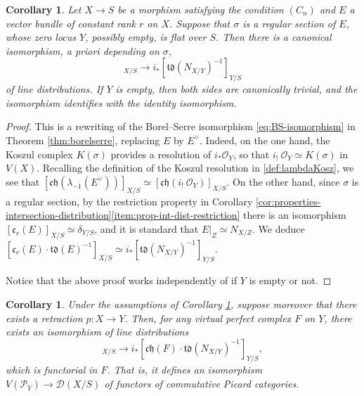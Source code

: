\documentclass[11pt]{article}
\theoremstyle{plain}
\newtheorem{corollary}[theorem]{Corollary}
\theoremstyle{definition}
\newcommand{\Dcal}{\mathcal D}
\newcommand{\Ocal}{\mathcal O}
\newcommand{\Pcal}{\mathcal P}
\newcommand{\cfrak}{\mathfrak c}
\newcommand{\chfrak}{\mathfrak {ch}}
\newcommand{\tdfrak}{\mathfrak {td}}
\begin{document}
\begin{corollary}\label{cor:Borel-Serre-consequence}
Let $X\to S$ be a morphism satisfying the condition $(C_n)$ and $E$ a vector bundle of constant rank $r$ on $X$. Suppose that $\sigma$ is a regular section of $E$, whose zero locus $Y$, possibly empty, is flat over $S$. Then there is a canonical isomorphism, a priori depending on $\sigma$,\vspace*{-3pt}
\begin{displaymath}
[\chfrak(i_! \ \Ocal_Y)]_{X/S} \to i_\ast [\tdfrak(N_{X/Y})^{-1}]_{Y/S}
\end{displaymath}
of line distributions. If $Y$ is empty, then both sides are canonically trivial, and the isomorphism identifies with the identity isomorphism.

\end{corollary}

\begin{proof}
This is a rewriting of the Borel--Serre isomorphism \eqref{eq:BS-isomorphism} in Theorem \ref{thm:borelserre}, replacing $E$ by $E^\vee$. Indeed, on the one hand, the Koszul complex $K(\sigma)$ provides a resolution of $i_{\ast}\Ocal_{Y}$, so that $i_{!}\ \Ocal_{Y}\simeq K(\sigma)$ in $V(X)$. Recalling the definition of the Koszul resolution in \eqref{def:lambdaKosz}, we see that $[\chfrak(\lambda_{-1}(E^{\vee}))]_{X/S}\simeq [\chfrak(i_{!}\ \Ocal_{Y})]_{X/S}$. On the other hand, since $\sigma$ is a regular section, by the restriction property in Corollary \ref{cor:properties-intersection-distribution}\eqref{item:prop-int-dist-restriction} there is an isomorphism $[\cfrak_r(E)]_{X/S} \simeq \delta_{Y/S}$, and it is standard that $E|_{Z} \simeq N_{X/Z}$. We deduce $[\cfrak_{r}(E)\cdot\tdfrak(E)^{-1}]_{X/S}\simeq i_{\ast}[\tdfrak(N_{X/Y})^{-1}]_{Y/S}$.

Notice that the above proof works independently of if $Y$ is empty or not.
\end{proof}

\begin{corollary}\label{cor:Borel-Serre-consequence2}
Under the assumptions of Corollary \ref{cor:Borel-Serre-consequence}, suppose moreover that there exists a retraction $p\colon X\to Y$. Then, for any virtual perfect complex $F$ on $Y$, there exists an isomorphism of line distributions\vspace*{-3pt}
\begin{displaymath}
[\chfrak(i_!\ F)]_{X/S} \to i_\ast [\chfrak(F) \cdot \tdfrak(N_{X/Y})^{-1}]_{Y/S},
\end{displaymath}
which is functorial in $F$. That is, it defines an isomorphism $V(\Pcal_{Y})\to\Dcal(X/S)$ of functors of commutative Picard categories.
\end{corollary}
\end{document}
